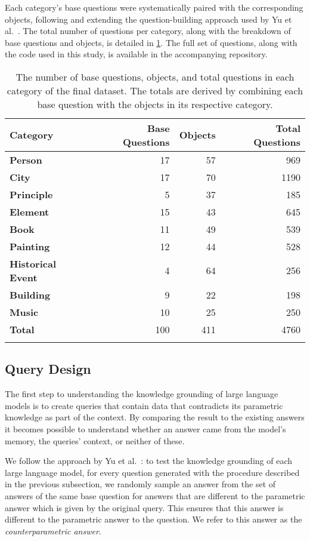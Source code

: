 Each category's base questions were systematically paired with the corresponding objects, following and extending the question-building approach used by Yu et al.~\cite{factual_recall}.
The total number of questions per category, along with the breakdown of base questions and objects, is detailed in \cref{category_amounts}.
The full set of questions, along with the code used in this study, is available in the accompanying repository.

\begin{table}[t]
	\centering
	\footnotesize
	\begin{tabular}{>{\bfseries}l r r r}
		\toprule
			\bfseries Category & \bfseries Base Questions & \bfseries Objects & \bfseries Total Questions \\
		\midrule
			Person & 17 & 57 & 969 \\
			City & 17 & 70 & 1190 \\
			Principle & 5 & 37 & 185 \\
			Element & 15 & 43 & 645 \\
			Book & 11 & 49 & 539 \\
			Painting & 12 & 44 & 528 \\
			Historical Event & 4 & 64 & 256 \\
			Building & 9 & 22 & 198 \\
			Music & 10 & 25 & 250 \\
		\midrule
			Total & 100 & 411 & 4760 \\
		\bottomrule \addlinespace[4pt]
	\end{tabular}
	\caption{The number of base questions, objects, and total questions in each category of the final dataset. The totals are derived by combining each base question with the objects in its respective category.}
	\label{category_amounts}
\end{table}

\subsection{Query Design}
\label{query_design}

The first step to understanding the knowledge grounding of large language models is to create queries that contain data that contradicts its parametric knowledge as part of the context.
By comparing the result to the existing answers it becomes possible to understand whether an answer came from the model's memory, the queries' context, or neither of these.

We follow the approach by Yu et al.~\cite{factual_recall}: to test the knowledge grounding of each large language model, for every question generated with the procedure described in the previous subsection, we randomly sample an answer from the set of answers of the same base question for answers that are different to the parametric answer which is given by the original query.
This ensures that this answer is different to the parametric answer to the question.
We refer to this answer as the \emph{counterparametric answer}.

